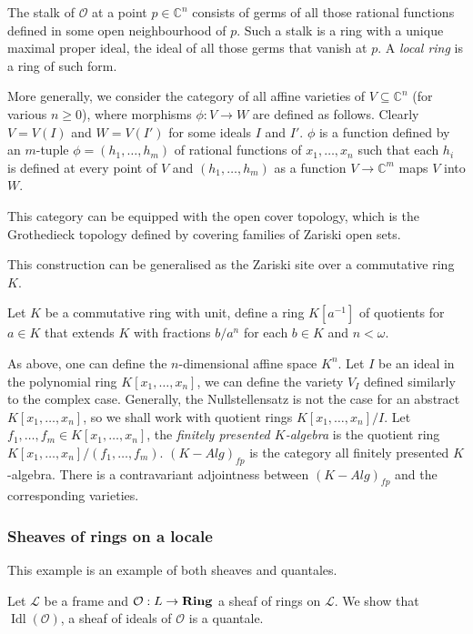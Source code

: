 \documentclass[a4paper]{article}
\theoremstyle{defin}
\theoremstyle{theorem}
\theoremstyle{claim}
\theoremstyle{prop}
\theoremstyle{lemma}
\theoremstyle{fact}
\theoremstyle{ex}
\theoremstyle{col}
\begin{document}
The stalk of $\mathcal{O}$ at a point $p \in \mathbb{C}^n$ consists of germs of all those rational functions defined in some open neighbourhood of $p$. Such a stalk is a ring with a unique maximal proper ideal, the ideal of all those germs that vanish at $p$. A \emph{local ring} is a ring of such form.

More generally, we consider the category of all affine varieties of $V \subseteq \mathbb{C}^n$ (for various $n \geq 0$), where morphisms $\phi : V \to W$ are defined as follows. Clearly $V = V(I)$ and $W = V(I')$ for some ideals $I$ and $I'$. $\phi$ is a function defined by an $m$-tuple $\phi = (h_1, \dots, h_m)$ of rational functions of $x_1, \dots, x_n$ such that each $h_i$ is defined at every point of $V$ and $(h_1, \dots, h_m)$ as a function $V \to \mathbb{C}^m$ maps $V$ into $W$.

This category can be equipped with the open cover topology, which is the Grothedieck topology defined by covering families of Zariski open sets.

This construction can be generalised as the Zariski site over a commutative ring $K$.

Let $K$ be a commutative ring with unit, define a ring $K[a^{-1}]$ of quotients for $a \in K$ that extends $K$ with fractions $b/a^n$ for each $b \in K$ and $n < \omega$.

As above, one can define the $n$-dimensional affine space $K^n$. Let $I$ be an ideal in the polynomial ring $K[x_1, \dots, x_n]$, we can define the variety $V_I$ defined similarly to the complex case. Generally, the Nullstellensatz is not the case for an abstract $K[x_1, \dots, x_n]$, so we shall work with quotient rings $K[x_1, \dots, x_n]/I$. Let $f_1, \dots, f_m \in K[x_1, \dots, x_n]$, the \emph{finitely presented $K$-algebra} is the quotient ring $K[x_1, \dots, x_n]/(f_1, \dots, f_m)$. $(K - Alg)_{fp}$ is the category all finitely presented $K$-algebra. There is a contravariant adjointness between $(K - Alg)_{fp}$ and the corresponding varieties.


\subsubsection{Sheaves of rings on a locale}

This example is an example of both sheaves and quantales.

Let $\mathcal{L}$ be a frame and $\mathcal{O} : L \to {\bf Ring}$ a sheaf of rings on $\mathcal{L}$. We show that $\operatorname{Idl}(\mathcal{O})$, a sheaf of ideals of $\mathcal{O}$ is a quantale.
\end{document}
